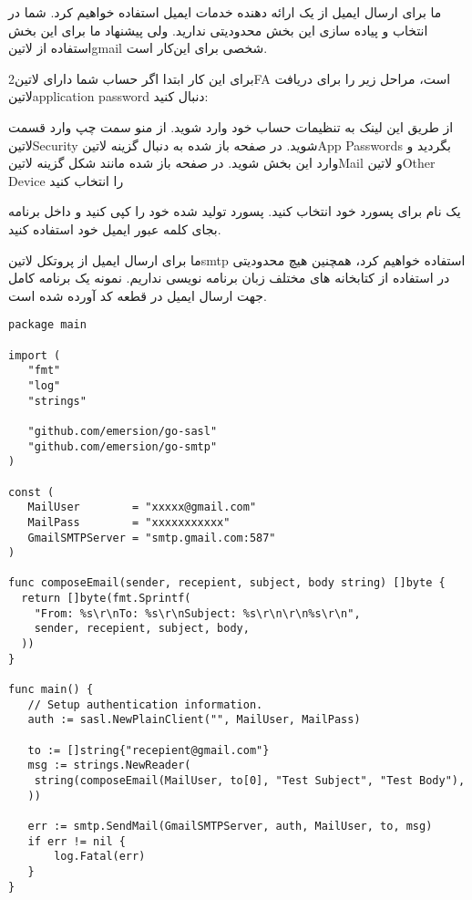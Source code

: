 \documentclass{../assignment}
\begin{document}

ما برای ارسال ایمیل از یک ارائه دهنده خدمات ایمیل استفاده خواهیم کرد. شما در انتخاب و پیاده سازی این بخش محدودیتی ندارید. ولی پیشنهاد ما برای این بخش استفاده از ‌لاتین{gmail} شخصی برای این‌کار است.

برای این کار ابتدا اگر حساب شما دارای ‌لاتین{2FA} است، مراحل زیر را برای دریافت ‌لاتین{application password} دنبال کنید:

 از طریق این لینک به تنظیمات حساب خود وارد شوید.
 از منو سمت چپ وارد قسمت ‌لاتین{Security} شوید.
 در صفحه باز شده به دنبال گزینه ‌لاتین{App Passwords} بگردید و وارد این بخش شوید.
 در صفحه باز شده مانند شکل  گزینه ‌لاتین{Mail} و ‌لاتین{Other Device} را انتخاب کنید

 یک نام برای پسورد خود انتخاب کنید.
پسورد تولید شده خود را کپی کنید و داخل برنامه بجای کلمه عبور ایمیل خود استفاده کنید.

ما برای ارسال ایمیل از پروتکل ‌لاتین{smtp} استفاده خواهیم کرد، همچنین هیچ محدودیتی در استفاده از کتابخانه های مختلف زبان برنامه نویسی نداریم.
نمونه یک برنامه کامل جهت ارسال ایمیل در قطعه کد  آورده شده است.

\begin{listing}


\begin{latin}
\begin{verbatim}
package main

import (
   "fmt"
   "log"
   "strings"

   "github.com/emersion/go-sasl"
   "github.com/emersion/go-smtp"
)

const (
   MailUser        = "xxxxx@gmail.com"
   MailPass        = "xxxxxxxxxxx"
   GmailSMTPServer = "smtp.gmail.com:587"
)

func composeEmail(sender, recepient, subject, body string) []byte {
  return []byte(fmt.Sprintf(
    "From: %s\r\nTo: %s\r\nSubject: %s\r\n\r\n%s\r\n",
    sender, recepient, subject, body,
  ))
}

func main() {
   // Setup authentication information.
   auth := sasl.NewPlainClient("", MailUser, MailPass)

   to := []string{"recepient@gmail.com"}
   msg := strings.NewReader(
    string(composeEmail(MailUser, to[0], "Test Subject", "Test Body"),
   ))

   err := smtp.SendMail(GmailSMTPServer, auth, MailUser, to, msg)
   if err != nil {
       log.Fatal(err)
   }
}
\end{verbatim}
\end{latin}

\end{listing}
\end{document}
